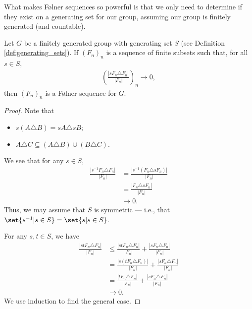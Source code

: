 \documentclass[10pt]{mypackage2}
\begin{document}
What makes Følner sequences so powerful is that we only need to determine if they exist on a generating set for our group, assuming our group is finitely generated (and countable).
\begin{lemma}\label{lemma:folner_condition_generating_set}
  Let $G$ be a finitely generated group with generating set $S$ (see Definition \ref{def:generating_sets}). If $\left(F_n\right)_n$ is a sequence of finite subsets such that, for all $s\in S$,
  \begin{align*}
    \left(\frac{\left\vert sF_n\triangle F_n \right\vert}{\left\vert F_n \right\vert}\right)_n\rightarrow 0,
  \end{align*}
  then $\left(F_n\right)_n$ is a Følner sequence for $G$.
\end{lemma}
\begin{proof}
  Note that
  \begin{itemize}
    \item $s\left(A\triangle B\right) = sA\triangle sB$;
    \item $A\triangle C \subseteq \left(A\triangle B\right) \cup \left(B\triangle C\right)$.
  \end{itemize}
  We see that for any $s\in S$,
  \begin{align*}
    \frac{\left\vert s^{-1}F_n\triangle F_n \right\vert}{\left\vert F_n \right\vert} &= \frac{\left\vert s^{-1}\left(F_n\triangle sF_n\right) \right\vert}{\left\vert F_n \right\vert}\\
                                                                                     &= \frac{\left\vert F_n\triangle sF_n \right\vert}{\left\vert F_n \right\vert}\\
                                                                                     &\rightarrow 0.
  \end{align*}
  Thus, we may assume that $S$ is symmetric --- i.e., that $\set{s^{-1}| s\in S} = \set{s | s\in S}$.\newline

  For any $s,t\in S$, we have
  \begin{align*}
    \frac{\left\vert stF_n\triangle F_n \right\vert}{\left\vert F_n \right\vert} &\leq \frac{\left\vert stF_n\triangle F_n \right\vert}{\left\vert F_n \right\vert} + \frac{\left\vert sF_n\triangle F_n \right\vert}{\left\vert F_n \right\vert}\\
                                                                                 &= \frac{\left\vert s\left(tF_n\triangle F_n\right) \right\vert}{\left\vert F_n \right\vert} + \frac{\left\vert sF_n\triangle F_n \right\vert}{\left\vert F_n \right\vert}\\
                                                                                 &= \frac{\left\vert tF_n\triangle F_n \right\vert}{\left\vert F_n \right\vert} + \frac{\left\vert sF_n\triangle F_n \right\vert}{\left\vert F_n \right\vert}\\
                                                                                 &\rightarrow 0.
  \end{align*}
  We use induction to find the general case.
\end{proof}
\end{document}
